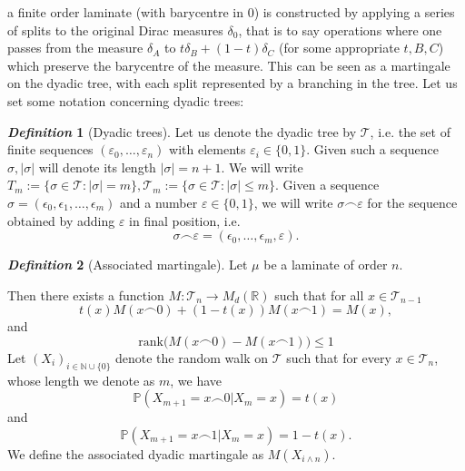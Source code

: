 \documentclass[11pt, a4paper, reqno]{elsarticle}
\theoremstyle{definition}
\newtheorem{definition}{\textsl{Definition}}
\theoremstyle{remark}
\begin{document}
a finite order laminate (with barycentre in $0$) is constructed by applying a series of splits
to the original Dirac measures $\delta_0$, that is to say operations 
where one passes from the measure $\delta_A$
to $t \delta_{B}+(1-t)\delta_C$ (for some appropriate $t,B,C$) which preserve the barycentre of the measure. This can be seen 
as a martingale on the dyadic tree, with each split represented by a branching in the tree.
Let us set some notation concerning dyadic trees:
\begin{definition}[Dyadic trees]
    Let us denote the dyadic tree by $\mathcal T$,
i.e. the set of finite sequences
$(\varepsilon_0,\dots, \varepsilon_n)$ 
with elements
$\varepsilon_{i}\in\{0, 1\}$.
Given such a sequence $\sigma, |\sigma|$ will denote its length $|\sigma|=n+1$.
We will write $T_m:=\{\sigma\in\mathcal T\colon |\sigma|=m\},
\mathcal T_m:=\{\sigma\in\mathcal T\colon |\sigma|\le m\}$.
Given a sequence $\sigma=(\epsilon_0, \epsilon_1,\dots,\epsilon_m)$ and a number $\varepsilon\in\{0,1\}$, we will 
write $\sigma \frown \varepsilon$ for the sequence obtained by adding $\varepsilon$
in final position, i.e.
\begin{equation*}
    \sigma\frown \varepsilon=(\epsilon_0,\dots, \epsilon_m,\varepsilon).
\end{equation*}
\end{definition}
\begin{definition}[Associated martingale]
Let $\mu$ be a laminate of order $n$.

Then there exists a function
$M\colon \mathcal T_n\to M_d(\mathbb{R})$ such that for all $x\in \mathcal T_{n-1}$
\begin{equation}
	t(x)M(x\frown  0)
+
	(1-t(x))M(x\frown  1)
=
	M(x),    
\end{equation}
and
\begin{equation}\label{eq : rankmart}
	\mathrm{rank}\big(
		M(x\frown  0)
	-
		M(x\frown  1)
		\big)
\le
	1
\end{equation}
Let $(X_i)_{i\in \mathbb{N}\cup\{0\}}$
denote the random walk on $\mathcal T$
such that for every $x\in \mathcal T_n$,
whose length we denote as $m$, we have
\begin{equation*}
    \mathbb P(X_{m+1}=x\frown 
0|X_m=x)=t(x)
\end{equation*}
and
\begin{equation*}
    \mathbb P(X_{m+1}=x\frown 1|X_m=x)=1-t(x).
\end{equation*}
We define the 
associated dyadic martingale
as $M(X_{i\wedge n})$.
\end{definition}
\end{document}
